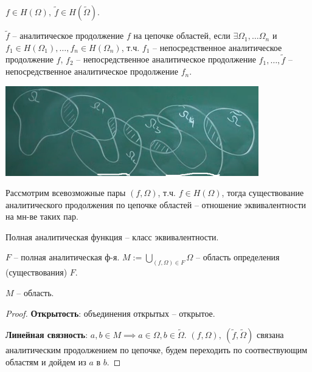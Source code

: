 \begin{definition}
    $f \in H(\Omega), \ \tilde{f} \in H(\tilde{\Omega})$.

    $\tilde{f}$ -- аналитическое продолжение $f$ на цепочке областей, если $\exists \Omega_1, \dots \Omega_n$ и $f_1 \in H(\Omega_1), \dots , f_n \in H(\Omega_n)$, т.ч. $f_1$ -- непосредственное аналитическое продолжение $f$, $f_2$ -- непосредственное аналитическое продолжение $f_1, \dots, \tilde{f}$ -- непосредственное аналитическое продолжение $f_n$.

    \begin{center}
        \includegraphics[width=11cm]{assets/04-functions-of-complex-variables/analitical-multiple-extension.png}
    \end{center}
\end{definition}



\begin{remark}
    Рассмотрим всевозможные пары $(f, \Omega)$, т.ч. $f \in H(\Omega)$, тогда существование аналитического продолжения по цепочке областей -- отношение эквивалентности на мн-ве таких пар.
\end{remark}


\begin{definition}
    Полная аналитическая функция -- класс эквивалентности.

    $F$ -- полная аналитическая ф-я. $M := \bigcup_{(f, \Omega) \in F} {\Omega}$ -- область определения (существования) $F$.
\end{definition}

\begin{statement}
    $M$ -- область.
\end{statement}
\begin{proof}
    \textbf{Открытость}: объединения открытых -- открытое.

    \textbf{Линейная связность}: $a, b \in M \implies a \in \Omega, b \in \tilde{\Omega}$. $(f, \Omega), \ (\tilde{f}, \tilde{\Omega})$ связана аналитическим продолжением по цепочке, будем переходить по соотвествующим областям и дойдем из $a$ в $b$.
\end{proof}


